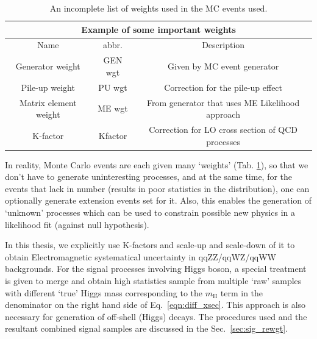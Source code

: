 \begin{table}[]
\centering
\begin{tabular}{|c|c|c|}
\hline
\multicolumn{3}{|c|}{Example of some important weights}                                                                                       \\ \hline
Name                  & abbr.   & Description                                                                                                 \\ \hline
Generator weight      & GEN wgt & Given by MC event generator                                                                                 \\ \hline
Pile-up weight        & PU wgt  & Correction for the pile-up effect                                                                           \\ \hline
Matrix element weight & ME wgt  & From generator that uses ME Likelihood approach \\ \hline
K-factor              & Kfactor & Correction for LO cross section of QCD processes                                                         \\ \hline
\end{tabular}
\caption{An incomplete list of weights used in the MC events used.}
\label{tab:MC_wgts}
\end{table}

In reality, Monte Carlo events are each given many `weights' (Tab. \ref{tab:MC_wgts}), so that
we don't have to generate uninteresting processes, and at the same time, for the events that lack
in number (results in poor statistics in the distribution), one can optionally generate
extension events set for it. Also, this enables the generation of `unknown' processes which can
be used to constrain possible new physics in a likelihood fit (against null hypothesis).

In this thesis, we explicitly use K-factors and scale-up and scale-down of it to 
obtain Electromagnetic systematical uncertainty in qqZZ/qqWZ/qqWW backgrounds. For the signal processes involving
Higgs boson, a special treatment is given to merge and obtain high statistics sample from
multiple `raw' samples with different `true' Higgs mass corresponding to the $m_\mathrm{H}$ term
in the denominator on the right hand side of Eq.~\ref{eqn:diff_xsec}.
This approach is also necessary for generation of off-shell (Higgs) decays. The procedures 
used and the resultant combined signal samples are discussed in the Sec.~\ref{sec:sig_rewgt}.

